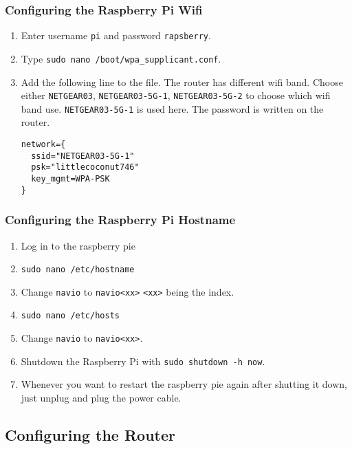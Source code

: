 \subsubsection{Configuring the Raspberry Pi Wifi}

\begin{enumerate}
    \item Enter username \texttt{pi} and password \texttt{rapsberry}.
    \item Type \texttt{sudo nano /boot/wpa\_supplicant.conf}.
    \item Add the following line to the file. The router has different wifi band. Choose either \texttt{NETGEAR03}, \texttt{NETGEAR03-5G-1}, \texttt{NETGEAR03-5G-2} to choose which wifi band use. \texttt{NETGEAR03-5G-1} is used here. The password is written on the router.

          \begin{verbatim}
network={
  ssid="NETGEAR03-5G-1"
  psk="littlecoconut746"
  key_mgmt=WPA-PSK
}
                    \end{verbatim}
\end{enumerate}

\subsubsection{Configuring the Raspberry Pi Hostname}
\begin{enumerate}
    \item Log in to the raspberry pie
    \item \texttt{sudo nano /etc/hostname}
    \item Change \texttt{navio} to \texttt{navio<xx>} \texttt{<xx>} being the index.
    \item \texttt{sudo nano /etc/hosts}
    \item Change \texttt{navio} to \texttt{navio<xx>}.
    \item Shutdown the Raspberry Pi with \texttt{sudo shutdown -h now}.
    \item Whenever you want to restart the raspberry pie again after shutting it down, just unplug and plug the power cable.
\end{enumerate}

\subsection{Configuring the Router}
